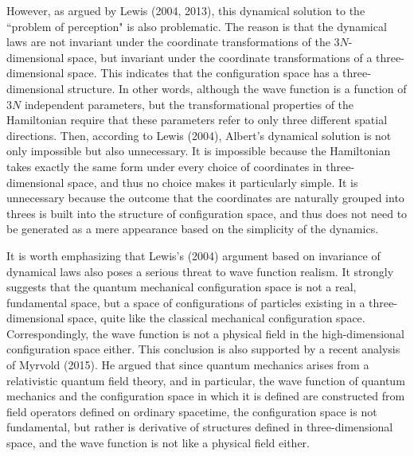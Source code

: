 However, as argued by Lewis (2004, 2013), this dynamical solution to the ``problem of perception" is also problematic.
The reason is that the dynamical laws are not invariant under the coordinate transformations of the $3N$-dimensional space, but  invariant under the coordinate transformations of a three-dimensional space. 
This indicates that the configuration space has a three-dimensional  structure. In other words, although the wave function is a function of $3N$ independent parameters, but the transformational properties of the Hamiltonian require that these parameters refer to only three different spatial directions. 
Then, according to Lewis (2004), Albert's dynamical solution is
not only impossible but also unnecessary. It is impossible because the Hamiltonian takes
exactly the same form under every choice of coordinates in three-dimensional space, and
thus no choice makes it particularly simple. It is unnecessary because the outcome that
the coordinates are naturally grouped into threes is built into the structure of
configuration space, and thus does not need to be generated as
a mere appearance based on the simplicity of the dynamics.

It is worth emphasizing that Lewis's (2004) argument based on invariance of dynamical laws also poses a serious threat to wave function realism. It strongly suggests that the quantum mechanical configuration space is not a real, fundamental space, but a space of configurations of particles existing in a three-dimensional space, quite like the classical mechanical configuration space. Correspondingly, the wave function is not a physical field in the high-dimensional configuration space either. This conclusion is also supported by a recent analysis of Myrvold (2015). He argued that since quantum mechanics arises from a relativistic quantum field theory, and in particular, the wave function of quantum mechanics and the configuration space in which it is defined are constructed from field operators defined on ordinary spacetime,
the configuration space is not fundamental, but rather is derivative of structures defined in three-dimensional space, and the wave function is not like a physical field either. 

